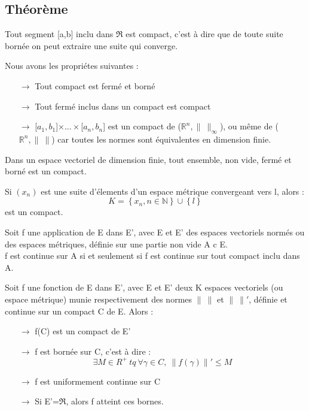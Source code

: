 \subsection{Théorème}
\begin{theo}
Tout segment [a,b] inclu dans $\Re$ est compact, c'est à dire que de toute suite bornée on peut extraire une suite qui converge.
\end{theo}
\begin{theo}
Nous avons les propriétes suivantes :
\begin{itemize}
 \item[$\rightarrow$] Tout compact est fermé et borné
 \item[$\rightarrow$] Tout fermé inclus dans un compact est compact
 \item[$\rightarrow$][$a_1,b_1$]$\times...\times$[$a_n,b_n$] est un compact de ($\mathbb{R}^n,\parallel~\parallel_{\infty}$), ou même de ($\mathbb{R}^n,\parallel~\parallel$) car toutes les normes sont équivalentes en dimension finie.
\end{itemize}
\end{theo}
\begin{theo}
Dans un espace vectoriel de dimension finie, tout ensemble, non vide, fermé et borné est un compact.
\end{theo}
\begin{prop}
Si $(x_n)$ est une suite d'élements d'un espace métrique convergeant vers l, alors : 
$$K = \left\lbrace x_n, n \in \mathbb{N} \right\rbrace \cup \left\lbrace l\right\rbrace  $$
est un compact.
\end{prop}
\begin{coro}
Soit f une application de E dans E', avec E et E' des espaces vectoriels normés ou des espaces métriques, définie sur une partie non vide A c E.\\
f est continue sur A si et seulement si f est continue sur tout compact inclu dans A.
\end{coro}
\begin{theo}
Soit f une fonction de E dans E', avec E et E' deux K espaces vectoriels (ou espace métrique) munie respectivement des normes $\parallel~\parallel$ et $\parallel~\parallel'$, définie et continue sur un compact C de E. Alors :
\begin{itemize}
 \item[$\rightarrow$] f(C) est un compact de E'
 \item[$\rightarrow$] f est bornée sur C, c'est à dire : $$\exists M \in R^+~ tq~ \forall \gamma \in C,~ \parallel f(\gamma)\parallel' \leq M$$
 \item[$\rightarrow$] f est uniformement continue sur C
 \item[$\rightarrow$] Si E'=$\Re$, alors f atteint ces bornes.
\end{itemize}
\end{theo}